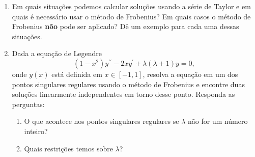 \begin{enumerate}
	\item Em quais situações podemos calcular soluções usando a série de Taylor e em
	      quais é necessário usar o método de Frobenius? Em quais casos o método de
	      Frobenius \textbf{não} pode ser aplicado? Dê um exemplo para cada uma dessas
	      situações.

	\item  Dada a equação de Legendre
	      $$(1-x^2)y^{\prime\prime}-2xy^{\prime}+\lambda(\lambda+1)y=0,$$ onde $y(x)$
	      está definida em $x\in[-1,1]$, resolva a equação em um dos pontos singulares
	      regulares usando o método de Frobenius e encontre duas soluções linearmente
	      independentes em torno desse ponto. Responda as perguntas:
	      \begin{enumerate}
		      \item O que acontece nos pontos singulares regulares se $\lambda$ não for
		            um número inteiro?
		      \item Quais restrições temos sobre $\lambda$?
	      \end{enumerate}
\end{enumerate}


